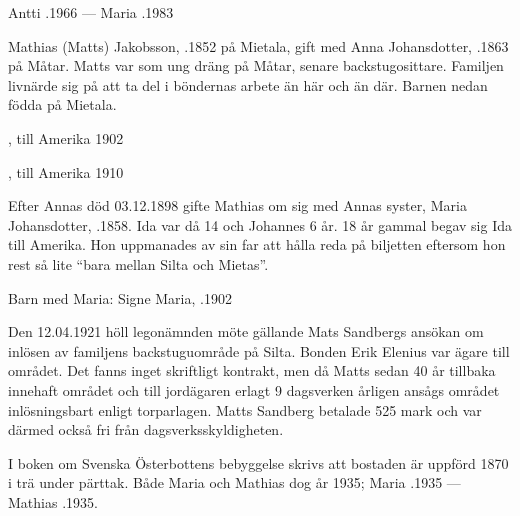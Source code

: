 Antti .1966  ---  Maria .1983


Mathias (Matts) Jakobsson, .1852 på Mietala, gift med Anna Johansdotter, .1863 på Måtar. Matts var som ung dräng på Måtar, senare backstugosittare. Familjen livnärde sig på att ta del i böndernas arbete än här och än där. Barnen nedan födda på Mietala.
\begin{jhchildren}
  \item {}, till Amerika 1902
  \item {}
  \item {}
  \item {}
  \item {}, till Amerika 1910
  \item {}
\end{jhchildren}

Efter Annas död 03.12.1898 gifte Mathias om sig med Annas syster, Maria Johansdotter,  .1858. Ida var då 14 och Johannes 6 år. 18 år gammal begav sig Ida till Amerika. Hon uppmanades av sin far att hålla reda på biljetten eftersom hon rest så lite ``bara mellan Silta och Mietas''.

Barn med Maria: Signe Maria, .1902

Den 12.04.1921 höll legonämnden möte gällande Mats Sandbergs ansökan om inlösen av familjens backstuguområde på Silta. Bonden Erik Elenius var ägare till området. Det fanns inget skriftligt kontrakt, men då Matts sedan 40 år tillbaka innehaft området och till jordägaren erlagt 9 dagsverken årligen ansågs området inlösningsbart enligt torparlagen. Matts Sandberg betalade 525 mark och var därmed också fri från dagsverksskyldigheten.

I boken om Svenska Österbottens bebyggelse skrivs att bostaden är uppförd 1870 i trä under pärttak. Både Maria och Mathias dog år 1935; Maria .1935  ---  Mathias .1935.






